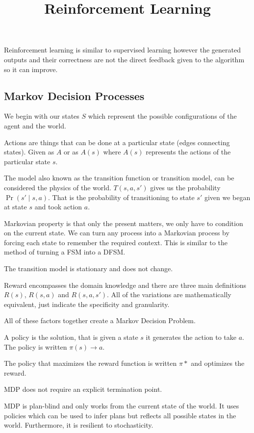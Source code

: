 \documentclass{article}
\title{Reinforcement Learning}
\author{}
\date{}
\begin{document}
\nocite{*}
\maketitle
{}
Reinforcement learning is similar to supervised learning however the generated 
outputs and their correctness are not the direct feedback given to the algorithm 
so it can improve. 

\subsection{Markov Decision Processes}

We begin with our states $S$ which represent the possible configurations of the
agent and the world. 

Actions are things that can be done at a particular state (edges connecting
states). Given as $A$ or as $A(s)$ where $A(s)$ represents the actions of the
particular state $s$.

The model also known as the transition function or transition model, can be
considered the physics of the world. $T(s,a,s')$ gives us the probability 
$\Pr(s'\mid s,a)$. That is the probability of transitioning to state $s'$ given
we began at state $s$ and took action $a$. 

Markovian property is that only the present matters, we only have to condition
on the current state. We can turn any process into a Markovian process by 
forcing each state to remember the required context. This is similar to the 
method of turning a FSM into a DFSM.

The transition model is stationary and does not change. 

Reward encompasses the domain knowledge and there are three main definitions
$R(s)$, $R(s,a)$ and $R(s,a,s')$. All of the variations are mathematically 
equivalent, just indicate the specificity and granularity. 

All of these factors together create a Markov Decision Problem. 

A policy is the solution, that is given a state $s$ it generates the action to 
take $a$. The policy is written $\pi(s) \rightarrow a$. 

The policy that maximizes the reward function is written $\pi*$ and optimizes
the reward. 

MDP does not require an explicit termination point. 

MDP is plan-blind and only works from the current state of the world. It uses
policies which can be used to infer plans but reflects all possible states in
the world. Furthermore, it is resilient to stochasticity. 
\end{document}
